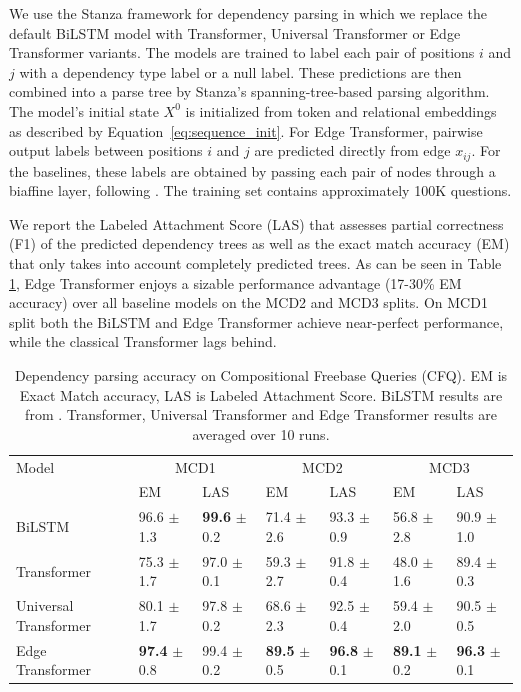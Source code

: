 \documentclass{article}
\begin{document}
We use the Stanza framework for dependency parsing
\citep{qi_stanza_2020} in which we replace the default BiLSTM model
with Transformer, Universal Transformer or Edge Transformer variants. The models are
trained to label each pair of positions $i$ and $j$ with a dependency
type label or a null label. These predictions are then combined into a
parse tree by Stanza's spanning-tree-based parsing algorithm. The
model's initial state $X^0$ is initialized from token and relational
embeddings as described by Equation~\ref{eq:sequence_init}. For Edge
Transformer, pairwise output labels between positions $i$ and $j$ are
predicted directly from edge $x_{ij}$. For the baselines, these labels
are obtained by passing each pair of nodes through a biaffine layer,
following \citet{dozat_deep_2017}.
The training set contains approximately 100K questions.

We report the Labeled Attachment Score (LAS) that assesses partial
correctness (F1) of the predicted dependency trees as well as the
exact match accuracy (EM) that only takes into account completely
predicted trees. As can be seen in Table \ref{tbl:cfq_results}, Edge
Transformer enjoys a sizable performance advantage (17-30\% EM
accuracy) over all baseline models on the MCD2 and MCD3 splits. On
MCD1 split both the BiLSTM and Edge Transformer achieve near-perfect performance, while the classical Transformer lags behind. 

\begin{table}[] 
\small
\centering 
\caption{Dependency parsing accuracy on
    Compositional Freebase Queries (CFQ). EM is Exact Match accuracy,
    LAS is Labeled Attachment Score. BiLSTM results are from
    \cite{cfq_dependencies}. Transformer, Universal Transformer and Edge Transformer results
    are averaged over 10 runs.}
\label{tbl:cfq_results}
\begin{tabular}{lllllll}
\toprule
Model            & \multicolumn{2}{c}{MCD1} & \multicolumn{2}{c}{MCD2} & \multicolumn{2}{c}{MCD3} \\ %
                 & EM       & LAS        & EM       & LAS        & EM      & LAS
                 \\
\midrule
BiLSTM           & 96.6 $\pm$ 1.3        & \textbf{99.6} $\pm$ 0.2     & 71.4 $\pm$ 2.6      & 93.3 $\pm$ 0.9      & 56.8 $\pm$ 2.8      & 90.9  $\pm$ 1.0    \\
Transformer      & 75.3 $\pm$ 1.7        & 97.0 $\pm$ 0.1     & 59.3 $\pm$ 2.7       & 91.8 $\pm$ 0.4     & 48.0 $\pm$ 1.6      & 89.4 $\pm$ 0.3     \\
Universal Transformer      & 80.1 $\pm$ 1.7        & 97.8 $\pm$ 0.2     & 68.6 $\pm$ 2.3       & 92.5 $\pm$ 0.4     & 59.4 $\pm$ 2.0      & 90.5 $\pm$ 0.5     \\
Edge Transformer & \textbf{97.4} $\pm$ 0.8       & 99.4 $\pm$ 0.2     & \textbf{89.5} $\pm$ 0.5       & \textbf{96.8} $\pm$ 0.1  &   \textbf{89.1} $\pm$ 0.2      & \textbf{96.3}  $\pm$ 0.1   \\
\bottomrule
\end{tabular}
\end{table}
\end{document}
